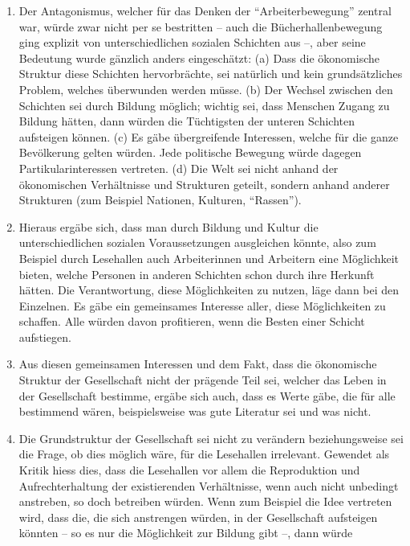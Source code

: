\documentclass[a4paper,
fontsize=11pt,
oneside,
numbers=noperiodatend,
parskip=half-,
bibliography=totoc,
final
]{scrartcl}
\begin{document}
\begin{enumerate}
\def\labelenumi{(\arabic{enumi})}
\item
  Der Antagonismus, welcher für das Denken der
  \enquote{Arbeiterbewegung} zentral war, würde zwar nicht per se
  bestritten -- auch die Bücherhallenbewegung ging explizit von
  unterschiedlichen sozialen Schichten aus --, aber seine Bedeutung
  wurde gänzlich anders eingeschätzt: (a) Dass die ökonomische Struktur
  diese Schichten hervorbrächte, sei natürlich und kein grundsätzliches
  Problem, welches überwunden werden müsse. (b) Der Wechsel zwischen den
  Schichten sei durch Bildung möglich; wichtig sei, dass Menschen Zugang
  zu Bildung hätten, dann würden die Tüchtigsten der unteren Schichten
  aufsteigen können. (c) Es gäbe übergreifende Interessen, welche für
  die ganze Bevölkerung gelten würden. Jede politische Bewegung würde
  dagegen Partikularinteressen vertreten. (d) Die Welt sei nicht anhand
  der ökonomischen Verhältnisse und Strukturen geteilt, sondern anhand
  anderer Strukturen (zum Beispiel Nationen, Kulturen,
  \enquote{Rassen}).
\item
  Hieraus ergäbe sich, dass man durch Bildung und Kultur die
  unterschiedlichen sozialen Voraussetzungen ausgleichen könnte, also
  zum Beispiel durch Lesehallen auch Arbeiterinnen und Arbeitern eine
  Möglichkeit bieten, welche Personen in anderen Schichten schon durch
  ihre Herkunft hätten. Die Verantwortung, diese Möglichkeiten zu
  nutzen, läge dann bei den Einzelnen. Es gäbe ein gemeinsames Interesse
  aller, diese Möglichkeiten zu schaffen. Alle würden davon profitieren,
  wenn die Besten einer Schicht aufstiegen.
\item
  Aus diesen gemeinsamen Interessen und dem Fakt, dass die ökonomische
  Struktur der Gesellschaft nicht der prägende Teil sei, welcher das
  Leben in der Gesellschaft bestimme, ergäbe sich auch, dass es Werte
  gäbe, die für alle bestimmend wären, beispielsweise was gute Literatur
  sei und was nicht.
\item
  Die Grundstruktur der Gesellschaft sei nicht zu verändern
  beziehungsweise sei die Frage, ob dies möglich wäre, für die
  Lesehallen irrelevant. Gewendet als Kritik hiess dies, dass die
  Lesehallen vor allem die Reproduktion und Aufrechterhaltung der
  existierenden Verhältnisse, wenn auch nicht unbedingt anstreben, so
  doch betreiben würden. Wenn zum Beispiel die Idee vertreten wird, dass
  die, die sich anstrengen würden, in der Gesellschaft aufsteigen
  könnten -- so es nur die Möglichkeit zur Bildung gibt --, dann würde

\end{enumerate}
\end{document}
